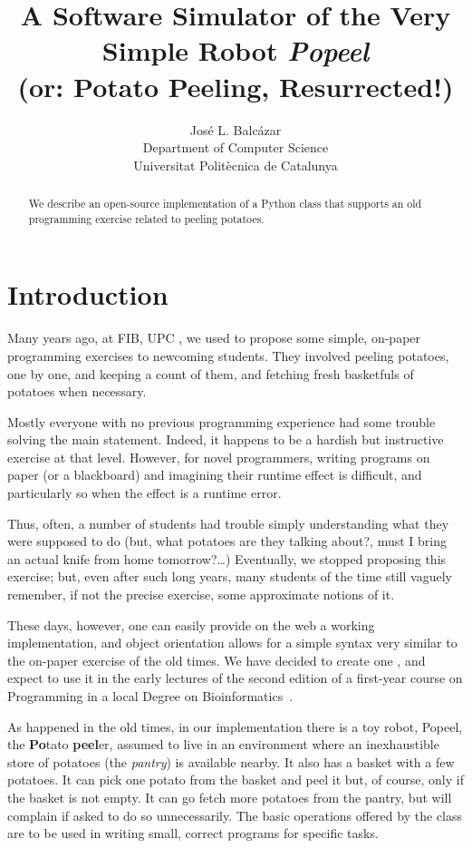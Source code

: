 \documentclass[12pt]{article}
\title{A Software Simulator of the Very Simple Robot \emph{Popeel}%
\\ \medskip\Large
(or: Potato Peeling, Resurrected!)
}
\author{Jos\'e L. Balc\'azar \\
{Department of Computer Science} \\
{Universitat Polit\`ecnica de Catalunya}}
\begin{document}
\maketitle

\begin{abstract}
We describe an open-source implementation of a
Python class that supports an old programming
exercise related to peeling potatoes.
\end{abstract}


\section{Introduction}%

Many years ago, at FIB, UPC \cite{FIB}, we used to 
propose some simple, on-paper programming exercises 
to newcoming students. They involved peeling potatoes, 
one by one, and keeping a count of them, and fetching 
fresh basketfuls of potatoes when necessary. 

Mostly everyone with no previous programming 
experience had some trouble solving the main
statement. Indeed, it happens to be a hardish but 
instructive exercise at that level. However, 
for novel programmers, writing programs on paper 
(or a blackboard) and imagining their runtime effect 
is difficult, and particularly so when the effect 
is a runtime error.

Thus, often, a number of students had trouble simply understanding 
what they were supposed to do \cite{PBblog} (but, what 
potatoes are they talking about?, must I bring an actual 
knife from home tomorrow?\dots) Eventually, we stopped 
proposing this exercise; but, even after such long years,
many students of the time still vaguely remember, 
if not the precise exercise, some approximate
notions of it.

These days, however, one can easily provide on the 
web a working implementation, and object orientation
allows for a simple syntax very similar to the 
on-paper exercise of the old times. We have decided
to create one \cite{Popeel}, and expect to use it in the early
lectures of the second edition of a first-year
course on Programming \cite{mireport} in a local 
Degree on Bioinformatics~\cite{BDBI}.

As happened in the old times, in our implementation
there is a toy robot, Popeel, the 
{\bf Po}tato {\bf peel}er, assumed to live in an 
environment where an inexhaustible store of potatoes 
(the \emph{pantry})
is available nearby. It also has a basket with a few 
potatoes. It can pick one potato from the basket and 
peel it but, of course, only if the basket is not empty. It can go 
fetch more potatoes from the pantry, 
but will complain 
if asked to do so unnecessarily. The basic operations
offered by the class are to be used in writing small,
correct programs for specific tasks.
\end{document}
